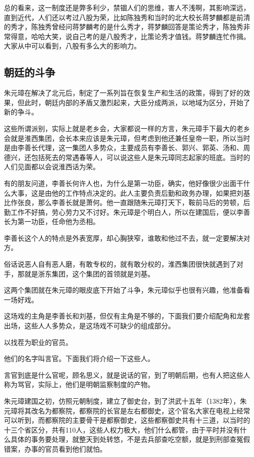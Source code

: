 \begin{multicols}{\theparacolNo}
		总的看来，这一制度还是弊多利少，禁锢人们的思维，害人不浅啊，其影响深远，直到近代，人们还以考过八股为荣，比如陈独秀和当时的北大校长蒋梦麟都是前清的秀才，陈独秀曾经问蒋梦麟考的是什么秀才，蒋梦麟回答是策论秀才，陈独秀非常得意，哈哈大笑，说自己考的是八股秀才，比策论秀才值钱。蒋梦麟连忙作揖。大家从中可以看到，八股有多么大的影响力。

		\subsection{朝廷的斗争}
		朱元璋在解决了北元后，制定了一系列旨在恢复生产和生活的政策，得到了好的效果，但此时，朝廷内部的矛盾又激烈起来，大臣分成两派，以地域为区分，开始了新的争斗。

		这些所谓派别，实际上就是老乡会，大家都说一样的方言，朱元璋手下最大的老乡会就是淮西集团，会长本来应该是朱元璋，但考虑到他还兼任皇帝一职，所以当时是由李善长代理，这一集团人多势众，主要成员有李善长、郭兴、郭英、汤和、周德兴，还包括死去的常遇春等人，可以说这些人是朱元璋同志起家的班底。当时的人们见面都以会说淮西话为荣。

		有的朋友问道，李善长何许人也，为什么是第一功臣，确实，他好像很少出面干什么大事，这是由他的工作特点决定的。此人主要负责后勤和政务办理，如果把刘基比作张良，那么李善长就是萧何。他一直跟随朱元璋打天下，鞍前马后的劳顿，后勤工作不好搞，劳心劳力又不讨好。朱元璋是个明白人，所以在建国后，便以李善长为第一功臣，任命他为丞相。

		李善长这个人的特点是外表宽厚，却心胸狭窄，谁敢和他过不去，就一定要解决对方。

		俗话说恶人自有恶人磨，有敢专权的，就有敢分权的，淮西集团很快就遇到了对手，那就是浙东集团，这个集团的首领就是刘基。

		这两个集团就在朱元璋的眼皮底下开始了斗争，朱元璋似乎也很有兴趣，他准备看一场好戏。

		这场戏的主角是李善长和刘基，但仅有主角是不够的，下面我们要介绍配角和龙套出场，这些人人多势众，是这场戏不可缺少的组成部分。

		以找茬为职业的官员。

		他们的名字叫言官。下面我们将介绍一下这些人。

		言官到底是什么官呢，顾名思义，就是说话的官，到了明朝后期，也有人把这些人称为骂官，实际上，他们是明朝监察制度的产物。

		朱元璋建国之初，仿照元朝制度，建立了御史台，到了洪武十五年（1382年），朱元璋将其改名为都察院，都察院的长官是左右都御史，这个官名大家在电视上经常可以听到，而都察院的主要骨干是都察御史，这些都察御史共有十三道，以当时的十三个省区分，共有110人，这些人权力极大，他们什么都管，由于平时并没有什么具体的事务要处理，就整天到处转悠，不是去兵部查吃空额，就是到刑部查冤假错案，办事的官员看到他们就怕。


\end{multicols}

